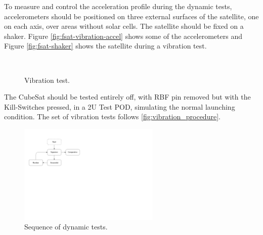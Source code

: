 To measure and control the acceleration profile during the dynamic tests, accelerometers should be positioned on three external surfaces of the satellite, one on each axis, over areas without solar cells. The satellite should be fixed on a shaker. Figure \ref{fig:fsat-vibration-accel} shows some of the accelerometers and Figure \ref{fig:fsat-shaker} shows the satellite during a vibration test.

\begin{figure}[!htb]
    \begin{center}
        ~
        \caption{Vibration test.}
        \label{fig:vibration-test}
    \end{center}
\end{figure}

The CubeSat should be tested entirely off, with RBF pin removed but with the Kill-Switches pressed, in a 2U Test POD, simulating the normal launching condition. The set of vibration tests follows \autoref{fig:vibration_procedure}.

\begin{figure}[!ht]
    \begin{center}
        \includegraphics[width=0.6\textwidth]{figures/vibration_procedure.pdf}
        \caption{Sequence of dynamic tests.}
        \label{fig:vibration_procedure}
    \end{center}
\end{figure}

